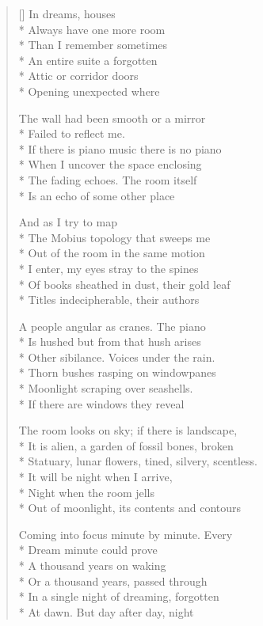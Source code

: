 \label{ch:dream_house}
\settowidth{\versewidth}{Statuary, lunar flowers, tined, silvery, scentless.}
\begin{verse}[\versewidth]
In dreams, houses\\*
Always have one more room\\*
Than I remember     sometimes\\*
An entire suite     a forgotten\\*
Attic or corridor     doors\\*
Opening unexpected where

The wall had been smooth or a mirror\\*
Failed to reflect me.\\*
If there is piano music there is no piano\\*
When I uncover the space enclosing\\*
The fading echoes.  The room itself\\*
Is an echo of some other place

And as I try to map\\*
The Mobius topology that sweeps me\\*
Out of the room in the same motion\\*
I enter, my eyes stray to the spines\\*
Of books sheathed in dust, their gold leaf\\*
Titles indecipherable, their authors

A people angular as cranes.   The piano\\*
Is hushed but from that hush arises\\*
Other sibilance.   Voices under the rain.\\*
Thorn bushes rasping on windowpanes\\*
Moonlight scraping over seashells.\\*
If there are windows they reveal

The room looks on sky; if there is landscape,\\*
It is alien, a garden of fossil bones, broken\\*
Statuary, lunar flowers, tined, silvery, scentless.\\*
It will be night when I arrive,\\*
Night when the room jells\\*
Out of moonlight, its contents and contours


Coming into focus minute by minute.  Every\\*
Dream minute could prove\\*
A thousand years on waking\\*
Or a thousand years, passed through\\*
In a single night of dreaming, forgotten\\*
At dawn.  But day after day, night


\end{verse}
